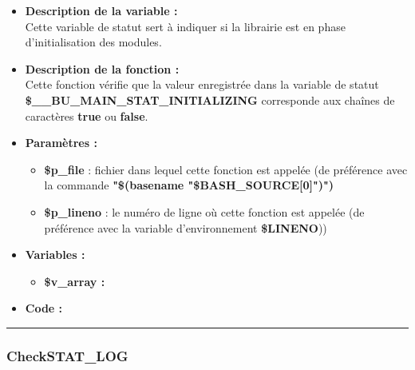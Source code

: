 \documentclass[a4paper,10pt]{article}
\begin{document}
\begin{itemize}
    \item \textbf{Description de la variable :}\\
    Cette variable de statut sert à indiquer si la librairie est en phase d'initialisation des modules.\\[1\baselineskip]

    \item \textbf{Description de la fonction :}\\
        Cette fonction vérifie que la valeur enregistrée dans la variable de statut \textbf{\color{orange}\$\_\_BU\_MAIN\_STAT\_INITIALIZING} corresponde aux chaînes de caractères \textbf{true} ou \textbf{false}.\\[1\baselineskip]

    \item \textbf{Paramètres :}
    \begin{itemize}
        \item \color{orange}\textbf{\$p\_file}\color{white} : fichier dans lequel cette fonction est appelée (de préférence avec la commande \textbf{"\$(\color{gray}basename \color{white}"\color{orange}\$BASH\_SOURCE[0]\color{white}")")}\\[1\baselineskip]

        \item \color{orange}\textbf{\$p\_lineno}\color{white} : le numéro de ligne où cette fonction est appelée (de préférence avec la variable d'environnement \textbf{\color{orange}\$LINENO}))\\[1\baselineskip]
    \end{itemize}

    \item \textbf{Variables :}
    \begin{itemize}
        \item \textbf{\color{orange}\$v\_array\color{white} :}\\[1\baselineskip]
    \end{itemize}


    \item \textbf{Code :}
\end{itemize}


\color{blue}\par\noindent\rule{\textwidth}{0.4pt}\color{white}

\color{blue}
\subsubsection{CheckSTAT\_LOG}\color{white}
\end{document}
